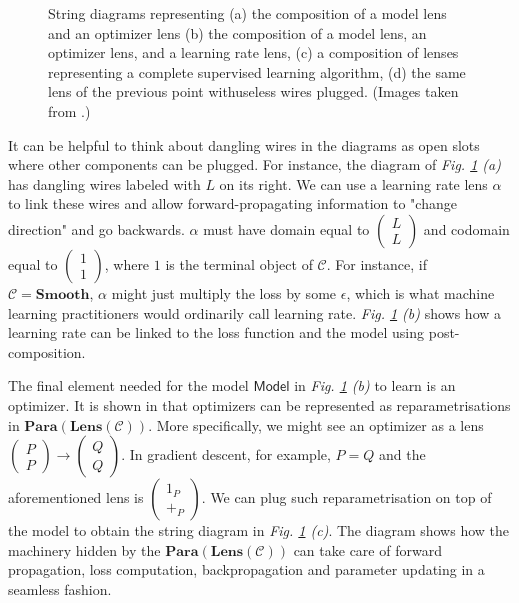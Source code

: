 \documentclass[11pt,a4paper,openright,twoside]{report}
\theoremstyle{plain}
\theoremstyle{definition}
\begin{document}
\begin{figure}[h]
\begin{center}
\begin{subfigure}{0.5\textwidth}
      \caption{}
    \end{subfigure}                   
    \caption[Supervised learning with parametric lenses]{String diagrams representing (a) the composition of a model lens and an optimizer lens (b) the composition of a model lens, an optimizer lens, and a learning rate lens, (c) a composition of lenses representing a complete supervised learning algorithm, (d) the same lens of the previous point withuseless wires plugged. (Images taken from \cite{cruttwell2022categorical}.)}
    \label{fig: suplearnlenses}
  \end{center}
\end{figure}

It can be helpful to think about dangling wires in the diagrams as open slots where other components can be plugged. For instance, the diagram of \textit{Fig. \ref{fig: suplearnlenses} (a)} has dangling wires labeled with $L$ on its right. We can use a learning rate lens $\alpha$ to link these wires and allow forward-propagating information to "change direction" and go backwards. $\alpha$ must have domain equal to $\left( \begin{smallmatrix} L \\ L \end{smallmatrix} \right)$ and codomain equal to $\left(\begin{smallmatrix} 1 \\ 1 \end{smallmatrix}\right)$, where $1$ is the terminal object of $\mathcal{C}$. For instance, if $\mathcal{C} = \mathbf{Smooth}$, $\alpha$ might just multiply the loss by some $\epsilon$, which is what machine learning practitioners would ordinarily call learning rate. \textit{Fig. \ref{fig: suplearnlenses} (b)} shows how a learning rate can be linked to the loss function and the model using post-composition.


The final element needed for the model $\mathsf{Model}$ in \textit{Fig. \ref{fig: suplearnlenses} (b)} to learn is an optimizer. It is shown in \cite{cruttwell2022categorical} that optimizers can be represented as reparametrisations in $\mathbf{Para}(\mathbf{Lens}(\mathcal{C}))$. More specifically, we might see an optimizer as a lens $\left( \begin{smallmatrix} P \\ P \end{smallmatrix} \right) \to \left( \begin{smallmatrix} Q \\ Q \end{smallmatrix} \right)$. In gradient descent, for example, $P = Q$ and the aforementioned lens is $\left( \begin{smallmatrix} 1_P \\ +_P \end{smallmatrix} \right)$. We can plug such reparametrisation on top of the model to obtain the string diagram in \textit{Fig. \ref{fig: suplearnlenses} (c)}. The diagram shows how the machinery hidden by the $\mathbf{Para}(\mathbf{Lens}(\mathcal{C}))$ can take care of forward propagation, loss computation, backpropagation and parameter updating in a seamless fashion.
\end{document}
